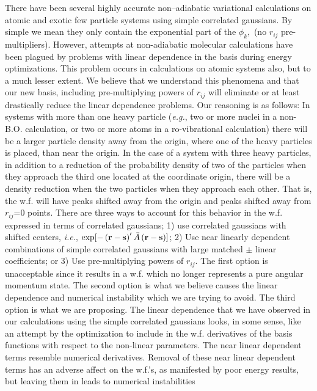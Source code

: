 {{There have been several highly accurate non--adiabatic variational
calculations on atomic and exotic few particle systems using simple
correlated gaussians\cite
{Kinghorn93,Kinghorn95b,A3,A37,Varga96}.
By simple we mean
they only contain the exponential part of the $\phi _k,$ (no $r_{ij}$
pre-multipliers). However, attempts at non-adiabatic molecular calculations
have been plagued by problems with linear dependence in the basis during
energy optimizations. This problem occurs in calculations on atomic systems
also, but to a much lesser extent. We believe that we understand this
phenomena and that our new basis, 
including pre-multiplying powers of $r_{ij}$
will eliminate or at least drastically reduce the linear dependence
problems. Our reasoning is as follows: In systems with more than one heavy
particle ({\it e.g.}, two or more nuclei in a non-B.O. calculation,
or two or more atoms in a ro-vibrational calculation)
there will be a larger particle density away from the origin,
where one of the heavy particles is placed, than near the origin.
In the case of a system with three heavy particles, in addition
to a reduction of the probability density of two of the particles
when they approach the third one located at the coordinate origin,
there will be a density reduction when the two particles when 
they approach
each other.
That is, the w.f. will have peaks shifted
away from the origin and peaks shifted away from 
$r_{ij}$=0 points. There are three ways to account for this behavior in
the w.f. expressed in terms of 
correlated gaussians; 1) use correlated gaussians
with shifted centers, {\it i.e.}, 
$\exp [-\left( {\bf r-s}\right) ^{\prime }%
\bar{A}\left( {\bf r-s}\right) ]$; 2) Use near linearly dependent
combinations of simple correlated gaussians with large matched $\pm $ linear
coefficients; or 3) Use pre-multiplying powers of $r_{ij}$. The first option
is unacceptable since it results in a w.f. which no longer
represents a pure angular momentum state. The second option is what we
believe causes the linear dependence and numerical instability which we are
trying to avoid. The third option is what we are proposing. The linear
dependence that we have observed in our calculations using the simple
correlated gaussians looks, in some sense, like an attempt by the
optimization to include in the w.f. derivatives of the basis
functions with respect to the non-linear parameters. The near linear
dependent terms resemble numerical derivatives. Removal of these near linear
dependent terms has an adverse affect on the w.f.'s, as manifested by
poor energy results, but leaving them in leads to numerical instabilities
}}
